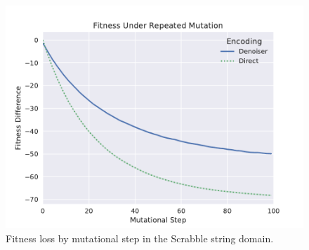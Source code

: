 \begin{figure}
  \includegraphics[width=\linewidth]{img/scrabble_fit_diff_vs_step}
  \caption{
    Fitness loss by mutational step in the Scrabble string domain.
    }\label{fig:scrabble_fit_diff_vs_step}
\end{figure}
